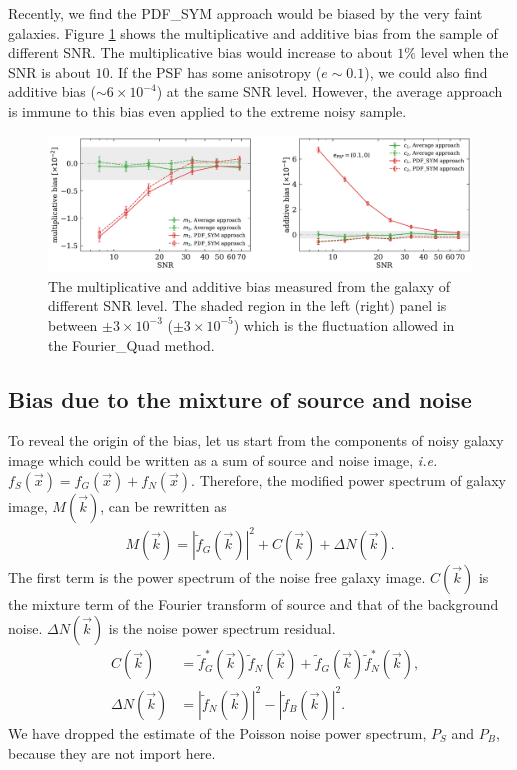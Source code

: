 \documentclass[twocolumn]{aastex62}
\def\ie{{\it i.e. }}
\begin{document}
Recently, we find the PDF\_SYM approach would be biased by the very faint galaxies. Figure \ref{fig:pts_mc} shows the multiplicative and additive bias from the sample of different SNR. The multiplicative bias would increase to about $1\%$ level when the SNR is about $10$. If the PSF has some anisotropy ($e \sim 0.1$), we could also find additive bias ($\sim 6\times 10^{-4}$) at the same SNR level. However, the average approach is immune to this bias even applied to the extreme noisy sample. 




\begin{figure}[htbp]
	\centering
	\includegraphics[width=0.9\linewidth]{figures/pts_sample_mc.pdf}
	\caption{The multiplicative and additive bias measured from the galaxy of different SNR level. The shaded region in the left (right) panel is between $\pm 3\times 10^{-3}$ ($\pm 3\times10^{-5}$) which is the fluctuation allowed in the Fourier\_Quad method. }\label{fig:pts_mc}
\end{figure}


\subsection{Bias due to the mixture of source and noise}
To reveal the origin of the bias, let us start from the components of noisy galaxy image which could be written as a sum of source and noise image, \ie$f_S(\vec{x}) = f_G(\vec{x}) + f_N(\vec{x})$. Therefore, the modified power spectrum of galaxy image, $M(\vec{k})$, can be rewritten as 
\begin{eqnarray}
M(\vec{k}) =  \left\vert\widetilde{f}_G(\vec{k})\right\vert^2+ C(\vec{k}) + \Delta N(\vec{k}).
\end{eqnarray}
The first term is the power spectrum of the noise free galaxy image. $C(\vec{k})$ is the mixture term of the Fourier transform of source and that of the background noise. $\Delta N(\vec{k})$ is the noise power spectrum residual. 
\begin{eqnarray}
& C(\vec{k})& = \widetilde{f}_{G}^{*}(\vec{k})\widetilde{f}_N(\vec{k}) + \widetilde{f}_{G}(\vec{k})\widetilde{f}_{N}^{*}(\vec{k}),\\ \nonumber
&\Delta N(\vec{k})& = \left\vert\widetilde{f}_N(\vec{k})\right\vert^2 -\left\vert\widetilde{f}_B(\vec{k})\right\vert^2.
\end{eqnarray}
We have dropped the estimate of the Poisson noise power spectrum, $P_S$ and $P_B$, because they are not import here. 
\end{document}
